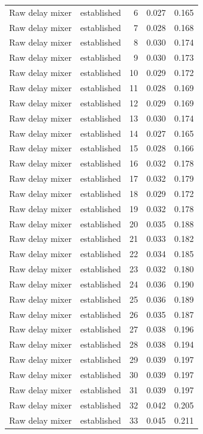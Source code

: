 \begin{tabular}{llrrr}
Raw delay mixer & established & 6 & 0.027 & 0.165 \\
Raw delay mixer & established & 7 & 0.028 & 0.168 \\
Raw delay mixer & established & 8 & 0.030 & 0.174 \\
Raw delay mixer & established & 9 & 0.030 & 0.173 \\
Raw delay mixer & established & 10 & 0.029 & 0.172 \\
Raw delay mixer & established & 11 & 0.028 & 0.169 \\
Raw delay mixer & established & 12 & 0.029 & 0.169 \\
Raw delay mixer & established & 13 & 0.030 & 0.174 \\
Raw delay mixer & established & 14 & 0.027 & 0.165 \\
Raw delay mixer & established & 15 & 0.028 & 0.166 \\
Raw delay mixer & established & 16 & 0.032 & 0.178 \\
Raw delay mixer & established & 17 & 0.032 & 0.179 \\
Raw delay mixer & established & 18 & 0.029 & 0.172 \\
Raw delay mixer & established & 19 & 0.032 & 0.178 \\
Raw delay mixer & established & 20 & 0.035 & 0.188 \\
Raw delay mixer & established & 21 & 0.033 & 0.182 \\
Raw delay mixer & established & 22 & 0.034 & 0.185 \\
Raw delay mixer & established & 23 & 0.032 & 0.180 \\
Raw delay mixer & established & 24 & 0.036 & 0.190 \\
Raw delay mixer & established & 25 & 0.036 & 0.189 \\
Raw delay mixer & established & 26 & 0.035 & 0.187 \\
Raw delay mixer & established & 27 & 0.038 & 0.196 \\
Raw delay mixer & established & 28 & 0.038 & 0.194 \\
Raw delay mixer & established & 29 & 0.039 & 0.197 \\
Raw delay mixer & established & 30 & 0.039 & 0.197 \\
Raw delay mixer & established & 31 & 0.039 & 0.197 \\
Raw delay mixer & established & 32 & 0.042 & 0.205 \\
Raw delay mixer & established & 33 & 0.045 & 0.211 \\

\end{tabular}
